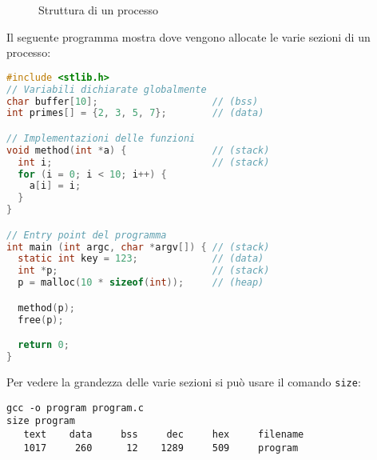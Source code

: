 \documentclass[a4paper]{article}
\begin{document}
\begin{figure}[H]
  \centering
  \caption{Struttura di un processo}
\end{figure}
\noindent
\begin{example}
  Il seguente programma mostra dove vengono allocate le varie sezioni di un processo:
\begin{lstlisting}[language=c]
#include <stlib.h>
// Variabili dichiarate globalmente
char buffer[10];                    // (bss)
int primes[] = {2, 3, 5, 7};        // (data)

// Implementazioni delle funzioni
void method(int *a) {               // (stack)
  int i;                            // (stack)
  for (i = 0; i < 10; i++) {
    a[i] = i;
  }
}

// Entry point del programma
int main (int argc, char *argv[]) { // (stack)
  static int key = 123;             // (data)
  int *p;                           // (stack)
  p = malloc(10 * sizeof(int));     // (heap)

  method(p);
  free(p);

  return 0;
}
\end{lstlisting}
\end{example}
Per vedere la grandezza delle varie sezioni si può usare il comando \texttt{size}:
\begin{lstlisting}
gcc -o program program.c
size program
   text    data     bss     dec     hex     filename
   1017     260      12    1289     509     program
\end{lstlisting}
\end{document}
